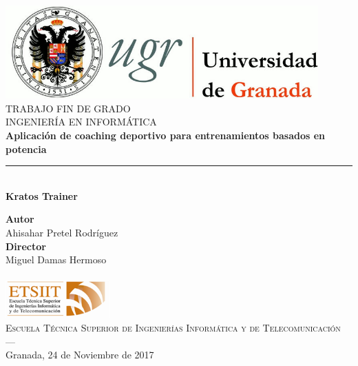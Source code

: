 \begin{titlepage}


\newlength{\centeroffset}
\setlength{\centeroffset}{-0.5\oddsidemargin}
\addtolength{\centeroffset}{0.5\evensidemargin}
\thispagestyle{empty}

\noindent\hspace*{\centeroffset}\begin{minipage}{\textwidth}

\centering
\includegraphics[width=0.9\textwidth]{imagenes/logo_ugr.jpg}\\[1.4cm]

\textsc{ \Large TRABAJO FIN DE GRADO\\[0.2cm]}
\textsc{ INGENIERÍA EN INFORMÁTICA}\\[1cm]
%
{\semiHuge\bfseries Aplicación de coaching deportivo para entrenamientos basados en potencia\\
}
\noindent\rule[-1ex]{\textwidth}{3pt}\\[3.5ex]
{\large\bfseries Kratos Trainer}
\end{minipage}

\vspace{2.5cm}
\noindent\hspace*{\centeroffset}\begin{minipage}{\textwidth}
\centering

\textbf{Autor}\\ {Ahisahar Pretel Rodríguez}\\[2.5ex]
\textbf{Director}\\
{Miguel Damas Hermoso\\
}\\[2cm]
\includegraphics[width=0.3\textwidth]{imagenes/etsiit_logo.png}\\[0.1cm]
\textsc{Escuela Técnica Superior de Ingenierías Informática y de Telecomunicación}\\
\textsc{---}\\
Granada, 24 de Noviembre de 2017
\end{minipage}
\end{titlepage}
